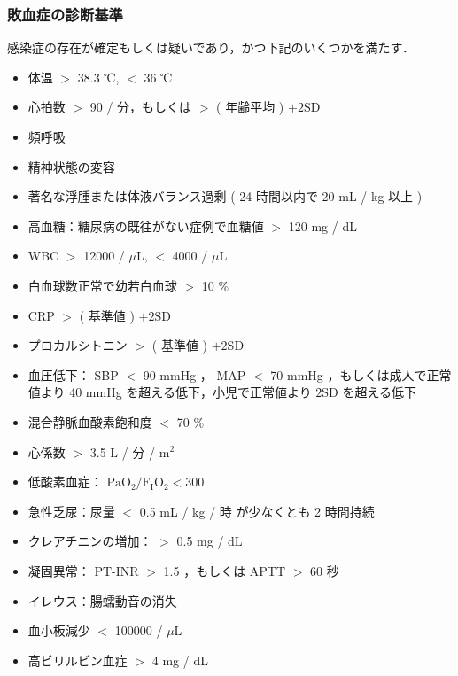 \documentclass[10pt,uplatex]{jsarticle}
\begin{document}
\subsubsection{敗血症の診断基準}

感染症の存在が確定もしくは疑いであり，かつ下記のいくつかを満たす．

\vspace{1em}

\begin{itemize}
\item 体温 $>$ 38.3 ℃, $<$ 36 ℃
\item 心拍数 $>$ 90 / 分，もしくは $>$ ( 年齢平均 ) $ + 2 \mathrm{SD} $
\item 頻呼吸
\item 精神状態の変容
\item 著名な浮腫または体液バランス過剰 ( 24 時間以内で 20 mL / kg 以上 )
\item 高血糖：糖尿病の既往がない症例で血糖値 $>$ 120 mg / dL
\end{itemize}


\begin{itemize}
\item WBC $>$ 12000 / $\mu$L, $<$ 4000 / $\mu$L
\item 白血球数正常で幼若白血球 $>$ 10 \%
\item CRP $>$ ( 基準値 ) $+ 2\mathrm{SD}$
\item プロカルシトニン $>$ ( 基準値 ) $+ 2\mathrm{SD}$
\end{itemize}

\begin{itemize}
\item 血圧低下： SBP $<$ 90 mmHg ， MAP $<$ 70 mmHg ，もしくは成人で正常値より 40 mmHg を超える低下，小児で正常値より $2\mathrm{SD}$ を超える低下
\item 混合静脈血酸素飽和度 $<$ 70 \%
\item 心係数 $>$ 3.5 L / 分 / $\mathrm{m}^2$
\end{itemize}

\begin{itemize}
\item 低酸素血症： $\mathrm{PaO}_2 / \mathrm{F_IO_2} < 300$
\item 急性乏尿：尿量 $<$ 0.5 mL / kg / 時 が少なくとも 2 時間持続
\item クレアチニンの増加： $>$ 0.5 mg / dL
\item 凝固異常： PT-INR $>$ 1.5 ，もしくは APTT $>$ 60 秒
\item イレウス：腸蠕動音の消失
\item 血小板減少 $<$ 100000 / $\mu$L
\item 高ビリルビン血症 $>$ 4 mg / dL
\end{itemize}
\end{document}
